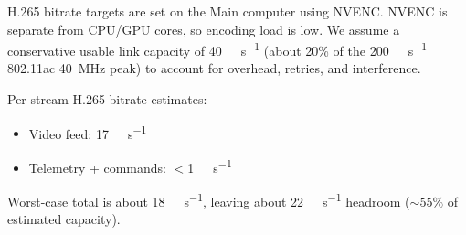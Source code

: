 %

H.265 bitrate targets are set on the Main computer using NVENC. NVENC is separate from CPU/GPU cores, 
so encoding load is low. We assume a conservative usable link capacity of 
\qty{40}{\mega\bit\per\second} (about 20\% of the \qty{200}{\mega\bit\per\second} 
802.11ac \qty{40}{\mega\hertz} peak) to account for overhead, retries, and interference.

Per-stream H.265 bitrate estimates:
\begin{itemize}
	\item Video feed: \qty{17}{\mega\bit\per\second}
	\item Telemetry + commands: $<$\qty{1}{\mega\bit\per\second}
\end{itemize}

Worst-case total is about \qty{18}{\mega\bit\per\second}, leaving about 
\qty{22}{\mega\bit\per\second} headroom (${\sim}55\%$ of estimated capacity).